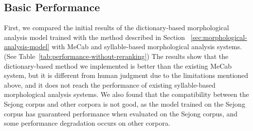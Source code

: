 \documentclass[AMS,STIX2COL]{WileyNJD-v2}
\begin{document}
    \subsection{Basic Performance}\label{subsec5.3}

    First, we compared the initial results of the dictionary-based morphological analysis model trained with the method described in Section ~\ref{sec:morphological-analysis-model} with MeCab and syllable-based morphological analysis systems. (See Table~\ref{tab:performance-without-reranking}) The results show that the dictionary-based method we implemented is better than the existing MeCab system, but it is different from human judgment due to the limitations mentioned above, and it does not reach the performance of existing syllable-based morphological analysis systems. We also found that the compatibility between the Sejong corpus and other corpora is not good, as the model trained on the Sejong corpus has guaranteed performance when evaluated on the Sejong corpus, and some performance degradation occurs on other corpora.
\end{document}
